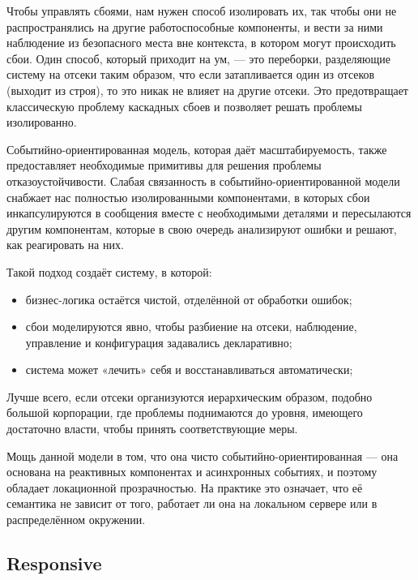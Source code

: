 Чтобы управлять сбоями, нам нужен способ изолировать их, так чтобы они не распространялись на другие работоспособные компоненты, и вести за ними наблюдение из безопасного места вне контекста, в котором могут происходить сбои. Один способ, который приходит на ум, --- это переборки, разделяющие систему на отсеки таким образом, что если затапливается один из отсеков (выходит из строя), то это никак не влияет на другие отсеки. Это предотвращает классическую проблему каскадных сбоев и позволяет решать проблемы изолированно.

Событийно-ориентированная модель, которая даёт масштабируемость, также предоставляет необходимые примитивы для решения проблемы отказоустойчивости. Слабая связанность в событийно-ориентированной модели снабжает нас полностью изолированными компонентами, в которых сбои инкапсулируются в сообщения вместе с необходимыми деталями и пересылаются другим компонентам, которые в свою очередь анализируют ошибки и решают, как реагировать на них.

Такой подход создаёт систему, в которой:

\begin{itemize}
  \item бизнес-логика остаётся чистой, отделённой от обработки ошибок;
  \item сбои моделируются явно, чтобы разбиение на отсеки, наблюдение, управление и конфигурация задавались декларативно;
  \item система может «лечить» себя и восстанавливаться автоматически;
\end{itemize}

Лучше всего, если отсеки организуются иерархическим образом, подобно большой корпорации, где проблемы поднимаются до уровня, имеющего достаточно власти, чтобы принять соответствующие меры.

Мощь данной модели в том, что она чисто событийно-ориентированная --- она основана на реактивных компонентах и асинхронных событиях, и поэтому обладает локационной прозрачностью. На практике это означает, что её семантика не зависит от того, работает ли она на локальном сервере или в распределённом окружении.

\subsection{Responsive}
\label{subsub:domain:reactive_programming:responsive}

